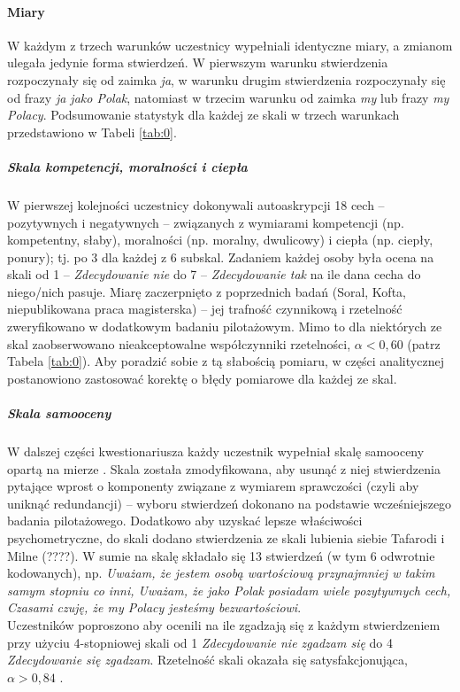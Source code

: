 \documentclass[man]{apa6}
\begin{document}
\paragraph{Miary}
W każdym z trzech warunków uczestnicy wypełniali identyczne miary, a zmianom ulegała jedynie forma stwierdzeń. W pierwszym warunku stwierdzenia rozpoczynały się od zaimka \emph{ja}, w warunku drugim stwierdzenia rozpoczynały się od frazy \emph{ja jako Polak}, natomiast w trzecim warunku od zaimka \emph{my} lub frazy \emph{my Polacy}. Podsumowanie statystyk dla każdej ze skali w trzech warunkach przedstawiono w Tabeli \ref{tab:0}.

\subparagraph{Skala kompetencji, moralności i ciepła}
W pierwszej kolejności uczestnicy dokonywali autoaskrypcji 18 cech -- pozytywnych i negatywnych -- związanych z wymiarami kompetencji (np. kompetentny, słaby), moralności (np. moralny, dwulicowy) i ciepła (np. ciepły, ponury); tj. po 3 dla każdej z 6 subskal. Zadaniem każdej osoby była ocena na skali od 1 -- \emph{Zdecydowanie nie} do 7 -- \emph{Zdecydowanie tak} na ile dana cecha do niego/nich pasuje. Miarę zaczerpnięto z poprzednich badań (Soral, Kofta, niepublikowana praca magisterska) -- jej trafność czynnikową i rzetelność zweryfikowano w dodatkowym badaniu pilotażowym. Mimo to dla niektórych ze skal zaobserwowano nieakceptowalne współczynniki rzetelności, $\alpha< 0,60$  (patrz Tabela \ref{tab:0}). Aby poradzić sobie z tą słabością pomiaru, w części analitycznej postanowiono zastosować korektę o błędy pomiarowe dla każdej ze skal.

\subparagraph{Skala samooceny}
W dalszej części kwestionariusza każdy uczestnik wypełniał skalę samooceny opartą na mierze \textcite{rosenberg1965society}. Skala została zmodyfikowana, aby usunąć z niej stwierdzenia pytające wprost o komponenty związane z wymiarem sprawczości (czyli aby uniknąć redundancji) -- wyboru stwierdzeń dokonano na podstawie wcześniejszego badania pilotażowego. Dodatkowo aby uzyskać lepsze właściwości psychometryczne, do skali dodano stwierdzenia ze skali lubienia siebie Tafarodi i Milne (????). W sumie na skalę składało się 13 stwierdzeń (w tym 6 odwrotnie kodowanych), np. \emph{Uważam, że jestem osobą wartościową przynajmniej w takim samym stopniu co inni, Uważam, że jako Polak posiadam wiele pozytywnych cech, Czasami czuję, że my Polacy jesteśmy bezwartościowi}.\\
Uczestników poproszono aby ocenili na ile zgadzają się z każdym stwierdzeniem przy użyciu 4-stopniowej skali od 1 \emph{Zdecydowanie nie zgadzam się} do 4 \emph{Zdecydowanie się zgadzam}. Rzetelność skali okazała się satysfakcjonująca, $\alpha > 0,84$ . \\
\end{document}
